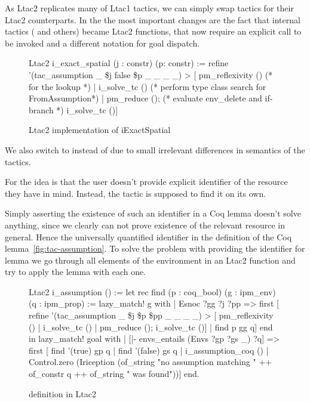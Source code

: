 As Ltac2 replicates many of Ltac1 tactics, we can simply swap tactics for their Ltac2 counterparts.
In the  the most important changes are the fact that internal tactics ( and others) became Ltac2 functions, that now require an explicit call to be invoked and a different notation for goal dispatch.
\begin{figure}[H]
\begin{coq}
Ltac2 i_exact_spatial (j : constr) (p: constr) :=
  refine '(tac_assumption _ \$j false \$p _ _ _ _) >
           [ pm_reflexivity () (* for the lookup *)
           | i_solve_tc () (* perform type class search for FromAssumption*)
           | pm_reduce (); (* evaluate env_delete and if-branch *)
             i_solve_tc ()]
\end{coq}
  \caption{Ltac2 implementation of iExactSpatial}
  \label{fig:iexact-ltac2}
\end{figure}

We also switch to  instead of  due to small irrelevant differences in semantics of the tactics.

For  the idea is that the user doesn't provide explicit identifier of the resource they have in mind.
Instead, the tactic is supposed to find it on its own.

Simply asserting the existence of such an identifier in a Coq lemma doesn't solve anything, since we clearly can not prove existence of the relevant resource in general.
Hence the universally quantified identifier in the definition of the Coq lemma~\ref{fig:tac-assumption}.
To solve the problem with providing the identifier for lemma we go through all elements of the environment in an Ltac2 function and try to apply the lemma with each one.

\begin{figure}
\begin{coq}
Ltac2 i_assumption () :=
  let rec find (p : coq_bool) (g : ipm_env) (q : ipm_prop) :=
      lazy_match! g with
      | Esnoc ?gg ?j ?pp =>
        first [ refine '(tac_assumption _ \$j \$p \$pp _ _ _ _) >
                [ pm_reflexivity ()
                | i_solve_tc ()
                | pm_reduce (); i_solve_tc ()]
              | find p gg q]
      end
  in
  lazy_match! goal with
  | [|- envs_entails (Envs ?gp ?gs _) ?q] =>
     first [ find '(true) gp q
           | find '(false) gs q
           | i_assumption_coq ()
           | Control.zero (Iriception (of_string "no assumption matching " ++
                                       of_constr q ++
                                       of_string " was found"))]
  end.
\end{coq}
\caption{ definition in Ltac2}
\label{fig:i-assumption-def}
\end{figure}



